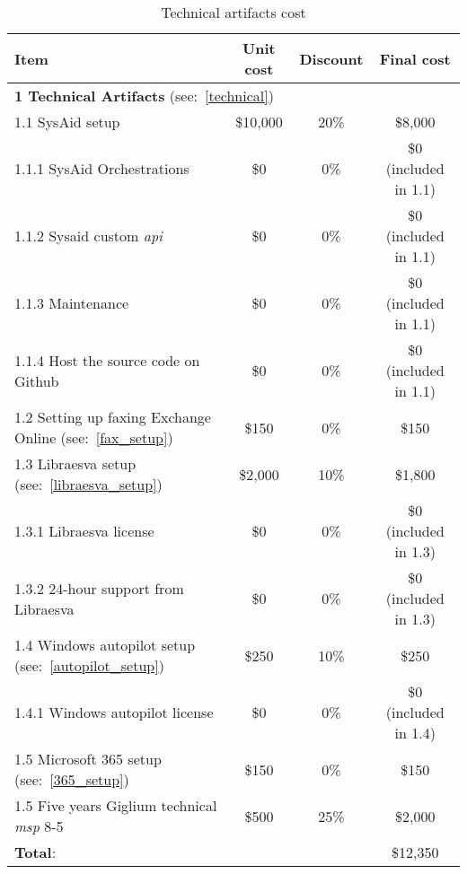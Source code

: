 \begin{table}[H]
	\centering
	\begin{tabular}{|l|c|c|c|} 
		\hline
		\textbf{Item} & \textbf{Unit cost} & \textbf{Discount} & \textbf{Final cost}   \\
		\hline
		\multicolumn{4}{|l|}{\textbf{1 Technical Artifacts} (see:~\ref{technical})}\\
		\hline
		\hspace{2mm}1.1 SysAid setup & \$10,000 & 20\% & \$8,000\\
		\hline
		\hspace{4mm}1.1.1 SysAid Orchestrations & \$0 & 0\% & \$0 (included in 1.1)\\
		\hline
		\hspace{4mm}1.1.2 Sysaid custom \textit{\gls{api}} & \$0 & 0\% & \$0 (included in 1.1)\\
		\hline
		\hspace{4mm}1.1.3 Maintenance	& \$0 & 0\% & \$0 (included in 1.1)\\
		\hline
		\hspace{4mm}1.1.4 Host the source code on Github & \$0 & 0\% & \$0 (included in 1.1)\\
		\hline
		\hspace{2mm}1.2 Setting up faxing Exchange Online (see:~\ref{fax_setup})  & \$150 & 0\% & \$150\\
		\hline
		\hspace{2mm}1.3 Libraesva setup (see:~\ref{libraesva_setup})  & \$2,000 & 10\% & \$1,800\\
		\hline
		\hspace{4mm}1.3.1 Libraesva license  & \$0 & 0\% & \$0 (included in 1.3)\\
		\hline
		\hspace{4mm}1.3.2 24-hour support from Libraesva  & \$0 & 0\% & \$0 (included in 1.3)\\
		\hline
		\hspace{2mm}1.4 Windows autopilot setup (see:~\ref{autopilot_setup})  & \$250 & 10\% & \$250\\
		\hline
		\hspace{4mm}1.4.1 Windows autopilot license  & \$0 & 0\% & \$0 (included in 1.4)\\
		\hline
		\hspace{2mm}1.5 Microsoft 365 setup (see:~\ref{365_setup})  & \$150 & 0\% & \$150 \\
		\hline
		\hspace{2mm}1.5 Five years Giglium technical \textit{\gls{msp}} 8{-}5  & \$500 & 25\% & \$2,000 \\
		\hline
		\multicolumn{3}{|l|}{\textbf{Total}:} & \$12,350\\
		\hline
	\end{tabular}
	\caption{Technical artifacts cost}\label{tab:tecnical_cost}
\end{table}

